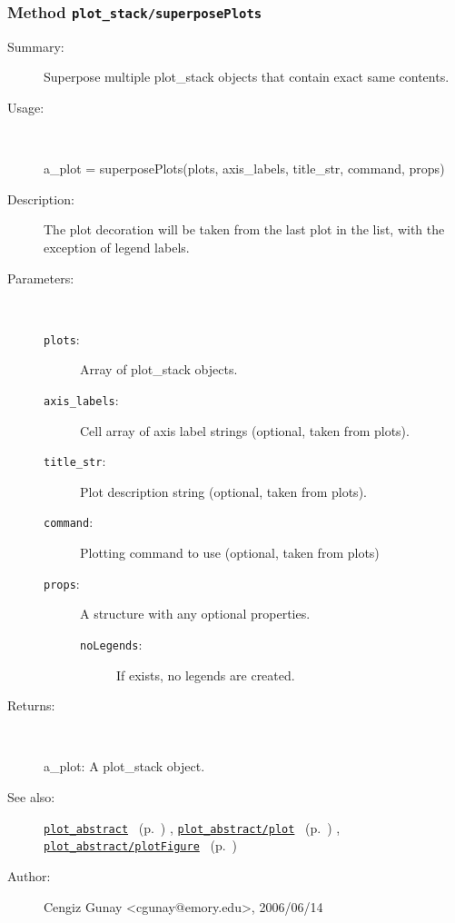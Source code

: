\subsubsection[Method \texttt{superposePlots}]{Method \texttt{plot\_stack/superposePlots}}%
%
\label{ref_plot_stack__superposePlots}%
\hypertarget{ref_plot_stack__superposePlots}{}%
\begin{description}
\item[Summary:]Superpose multiple plot\_stack objects that contain exact same contents.
%
\item[Usage:]~%
\begin{lyxcode}%
a\_plot = superposePlots(plots, axis\_labels, title\_str, command, props)
%
\end{lyxcode}%
%
\item[Description:]%
The plot decoration will be taken from the last plot in the list, 
 with the exception of legend labels.
\item[Parameters:]~
\begin{description}%
\item[\texttt{plots}:]
 Array of plot\_stack objects.
\item[\texttt{axis\_labels}:]
 Cell array of axis label strings (optional, taken from plots).
\item[\texttt{title\_str}:]
 Plot description string (optional, taken from plots).
\item[\texttt{command}:]
 Plotting command to use (optional, taken from plots)
\item[\texttt{props}:]
 A structure with any optional properties.
\begin{description}%
\item[\texttt{noLegends}:]
 If exists, no legends are created.
\end{description}%
\end{description}%
%
\item[Returns:]~

	a\_plot: A plot\_stack object.
%
%
\item[See also:]%
\hyperlink{ref_plot_abstract}{\texttt{plot\_abstract}}%
\ (p.~\pageref{ref_plot_abstract})%
%
, \hyperlink{ref_plot_abstract__plot}{\texttt{plot\_abstract/plot}}%
\ (p.~\pageref{ref_plot_abstract__plot})%
%
, \hyperlink{ref_plot_abstract__plotFigure}{\texttt{plot\_abstract/plotFigure}}%
\ (p.~\pageref{ref_plot_abstract__plotFigure})%
%
%
\item[Author:]%
Cengiz Gunay <cgunay@emory.edu>, 2006/06/14%
\end{description}
\methodline%
